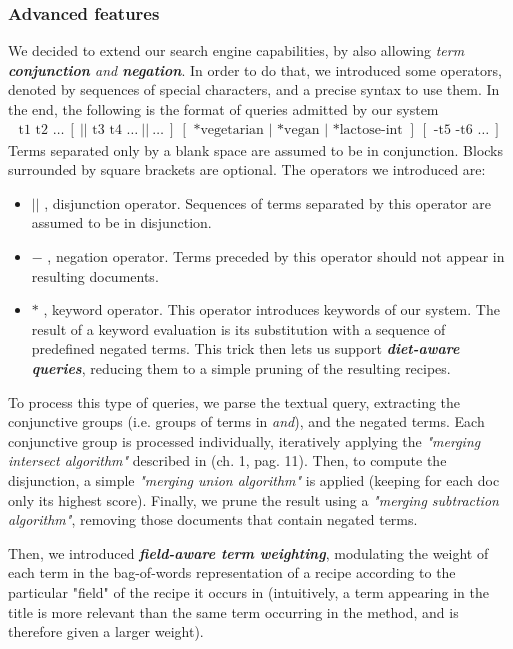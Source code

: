 \subsubsection{Advanced features}

We decided to extend our search engine capabilities, by also allowing \textit{term \textbf{conjunction} and \textbf{negation}}. In order to do that, we introduced some operators, denoted by sequences of special characters, and a precise syntax to use them. In the end, the following is the format of queries admitted by our system
\begin{align*}
	\text{t1 t2 }\ldots \ [ \ || \text{ t3 t4 } \ldots \ || \ \ldots \ ] \ [ \text{ *vegetarian } | \text{ *vegan } | \text{ *lactose-int }] \ [ \text{ -t5 -t6 }\ldots \ ]
\end{align*}
Terms separated only by a blank space are assumed to be in conjunction. Blocks surrounded by square brackets are optional. The operators we introduced are:
\begin{itemize}
	\item $||$ , disjunction operator. Sequences of terms separated by this operator are assumed to be in disjunction.
	
	\item $-$ , negation operator. Terms preceded by this operator should not appear in resulting documents.
	
	\item $*$ , keyword operator. This operator introduces keywords of our system. The result of a keyword evaluation is its substitution with a sequence of predefined negated terms. This trick then lets us support \textit{\textbf{diet-aware queries}}, reducing them to a simple pruning of the resulting recipes.
\end{itemize}
To process this type of queries, we parse the textual query, extracting the conjunctive groups (i.e. groups of terms in \textit{and}), and the negated terms. Each conjunctive group is processed individually, iteratively applying the \textit{"merging intersect algorithm"} described in \cite{iir} (ch. 1, pag. 11). Then, to compute the disjunction, a simple \textit{"merging union algorithm"} is applied (keeping for each doc only its highest score). Finally, we prune the result using a \textit{"merging subtraction algorithm"}, removing those documents that contain negated terms.

\medskip

\noindent Then, we introduced \textit{\textbf{field-aware term weighting}}, modulating the weight of each term in the bag-of-words representation of a recipe according to the particular "field" of the recipe it occurs in (intuitively, a term appearing in the title is more relevant than the same term occurring in the method, and is therefore given a larger weight).

